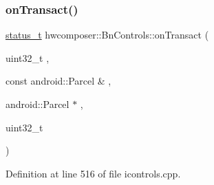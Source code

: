 \subsubsection{\texorpdfstring{on\+Transact()}{onTransact()}}
{\footnotesize\ttfamily \mbox{\hyperlink{hwcserviceapi_8h_a3806fb2027d9a316d8ca8d9b8b8eb96f}{status\+\_\+t}} hwcomposer\+::\+Bn\+Controls\+::on\+Transact (\begin{DoxyParamCaption}\item[{uint32\+\_\+t}]{,  }\item[{const android\+::\+Parcel \&}]{,  }\item[{android\+::\+Parcel $\ast$}]{,  }\item[{uint32\+\_\+t}]{ }\end{DoxyParamCaption})\hspace{0.3cm}{\ttfamily [override]}}



Definition at line 516 of file icontrols.\+cpp.


